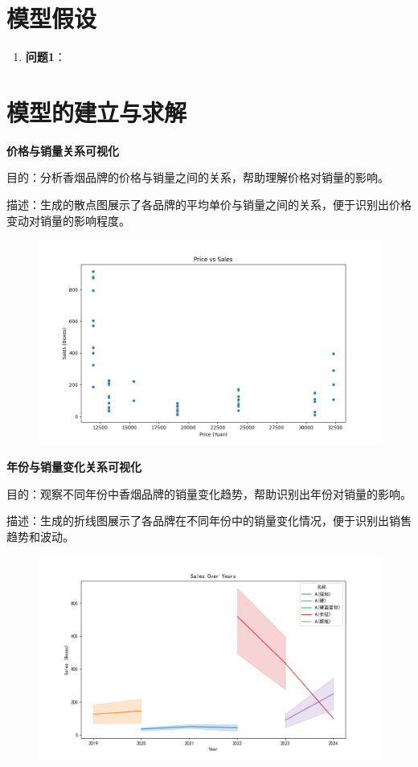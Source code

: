 \documentclass[a4paper]{article}
\begin{document}
\section{模型假设}

\begin{enumerate}
	\item \textbf{问题1}：
\end{enumerate}


\section{模型的建立与求解}

\textbf{价格与销量关系可视化}

目的：分析香烟品牌的价格与销量之间的关系，帮助理解价格对销量的影响。

描述：生成的散点图展示了各品牌的平均单价与销量之间的关系，便于识别出价格变动对销量的影响程度。

\begin{figure}[H]
	\centering
	\includegraphics[width=1.0\textwidth]{img/Figure_3.png}
\end{figure}

\textbf{年份与销量变化关系可视化}

目的：观察不同年份中香烟品牌的销量变化趋势，帮助识别出年份对销量的影响。

描述：生成的折线图展示了各品牌在不同年份中的销量变化情况，便于识别出销售趋势和波动。

\begin{figure}[H]
	\centering
	\includegraphics[width=1.0\textwidth]{img/Figure_4.png}
\end{figure}
\end{document}
